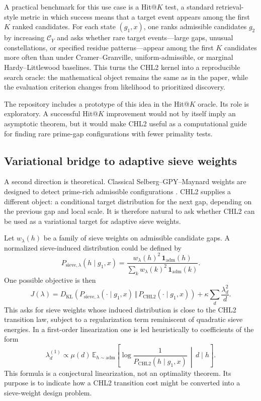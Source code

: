 \documentclass[10pt]{article}
\begin{document}
A practical benchmark for this use case is a Hit@$K$ test, a standard retrieval-style metric in which success means that a target event appears among the first $K$ ranked candidates.  For each state $(g_1,x)$, one ranks admissible candidates $g_2$ by increasing $\mathcal C_Y$ and asks whether rare target events---large gaps, unusual constellations, or specified residue patterns---appear among the first $K$ candidates more often than under Cramer--Granville, uniform-admissible, or marginal Hardy--Littlewood baselines.  This turns the CHL2 kernel into a reproducible search oracle: the mathematical object remains the same as in the paper, while the evaluation criterion changes from likelihood to prioritized discovery.

The repository includes a prototype of this idea in the Hit@$K$ oracle.  Its role is exploratory.  A successful Hit@$K$ improvement would not by itself imply an asymptotic theorem, but it would make CHL2 useful as a computational guide for finding rare prime-gap configurations with fewer primality tests.

\subsection{Variational bridge to adaptive sieve weights}
A second direction is theoretical.  Classical Selberg--GPY--Maynard weights are designed to detect prime-rich admissible configurations \cite{selberg,gpy,maynard-small}.  CHL2 supplies a different object: a conditional target distribution for the next gap, depending on the previous gap and local scale.  It is therefore natural to ask whether CHL2 can be used as a variational target for adaptive sieve weights.

Let $w_\lambda(h)$ be a family of sieve weights on admissible candidate gaps.  A normalized sieve-induced distribution could be defined by
\[
P_{\mathrm{sieve},\lambda}(h\mid g_1,x)
=
\frac{w_\lambda(h)^2\,\mathbf 1_{\mathrm{adm}}(h)}
{\sum_k w_\lambda(k)^2\,\mathbf 1_{\mathrm{adm}}(k)}.
\]
One possible objective is then
\[
J(\lambda)
=
D_{\mathrm{KL}}\!\left(P_{\mathrm{sieve},\lambda}(\cdot\mid g_1,x)\,\Vert\,P_{\mathrm{CHL2}}(\cdot\mid g_1,x)\right)
+
\kappa\sum_d\frac{\lambda_d^2}{d}.
\]
This asks for sieve weights whose induced distribution is close to the CHL2 transition law, subject to a regularization term reminiscent of quadratic sieve energies.  In a first-order linearization one is led heuristically to coefficients of the form
\[
\lambda_d^{(1)}
\propto
\mu(d)\,
\mathbb E_{h\sim \mathrm{adm}}
\left[
\log\frac{1}{P_{\mathrm{CHL2}}(h\mid g_1,x)}\,\middle|\,d\mid h
\right].
\]
This formula is a conjectural linearization, not an optimality theorem.  Its purpose is to indicate how a CHL2 transition cost might be converted into a sieve-weight design problem.
\end{document}
